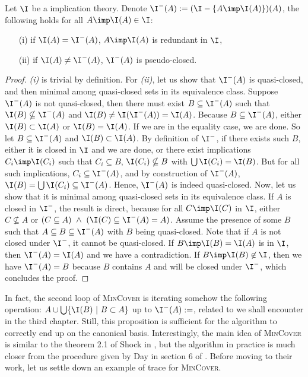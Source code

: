\begin{proposition} Let $\I$ be a  implication theory. 
	Denote $\I^{-}(A) := (\I - \{ A \imp \I(A) \})(A)$, the following holds for 
	all $A \imp \I(A) \in \I$:
	\begin{itemize}
		\item[(i)] if $\I(A) = \I^{-}(A)$, $A \imp \I(A)$ is redundant in $\I$,
		\item[(ii)] if $\I(A) \neq \I^{-}(A)$, $\I^{-}(A)$ is pseudo-closed.
	\end{itemize}
	
\end{proposition}

\begin{proof} \textit{(i)} is trivial by definition. For \textit{(ii)}, let us
show that $\I^{-}(A)$ is quasi-closed, and then minimal among quasi-closed 
sets in its equivalence class. Suppose $\I^{-}(A)$ is not quasi-closed, then 
there must exist $B \subseteq \I^{-}(A)$ such that $\I(B) \nsubseteq \I^{-}(A)$ 
and $\I(B) \neq \I(\I^{-}(A)) = \I(A)$. Because $B \subseteq \I^{-}(A)$, either 
$\I(B) \subset \I(A)$ or $\I(B) = \I(A)$. If we are in the equality case, 
we are done. So let $B \subseteq \I^{-}(A)$ and $\I(B) \subset \I(A)$. By 
definition of $\I^{-}$, if there exists such $B$, either it is closed in 
$\I$ and we are done, or there exist implications $C_i \imp \I(C_i)$ such that 
$C_i \subseteq B$, $\I(C_i) \nsubseteq B$ with $\bigcup \I(C_i) = \I(B)$. But 
for all such implications, $C_i \subseteq \I^{-}(A)$, and by construction of 
$\I^{-}(A)$, $\I(B) = \bigcup \I(C_i) \subseteq \I^{-}(A)$. Hence, 
$\I^{-}(A)$ is indeed quasi-closed. Now, let us show that it is minimal among 
quasi-closed sets in its equivalence class. If $A$ is closed in $\I^{-}$, the 
result is direct, because for all $C \imp \I(C)$ in $\I$, either $C \nsubseteq 
A$ or $(C \subseteq A) \ \land \ (\I(C) \subseteq \I^{-}(A) = A)$. Assume the 
presence of some $B$ such that $A \subseteq B \subseteq \I^{-}(A)$ with $B$ 
being quasi-closed. Note that if $A$ is not closed under $\I^{-}$, it
cannot be quasi-closed. If $B \imp \I(B) = \I(A)$ is in $\I$, then 
$\I^{-}(A) = \I(A)$ and we have a contradiction. If $B \imp \I(B) \not\in \I$, 
then we have $\I^{-}(A) = B$ because $B$ contains $A$ and will be closed under 
$\I^{-}$, which concludes the proof.
\end{proof}

\vspace{1.2em}

In fact, the second loop of \textsc{MinCover} is iterating somehow the following operation: $A \cup \bigcup \{\I(B) \ | \ B \subset A\}$ up to $\I^{-}(A) := $, related to  we shall encounter in the third chapter.
Still, this proposition is sufficient for the algorithm to correctly end up on the canonical basis. Interestingly, the main idea of \textsc{MinCover} is similar to the theorem 2.1 of Shock in \cite{shock_computing_1986}, but the algorithm in practice is much closer from the procedure given by Day in section 6 of \cite{day_lattice_1992}. Before moving to their work, let us settle down an example of trace for \textsc{MinCover}.


